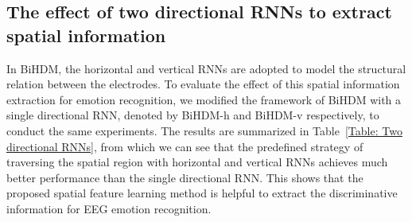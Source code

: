 \documentclass[journal]{IEEEtran}
\begin{document}
\subsection{The effect of two directional RNNs to extract spatial information}
In BiHDM, the horizontal and vertical RNNs are adopted to model the structural relation between the electrodes. To evaluate the effect of this spatial information extraction for emotion recognition, we modified the framework of BiHDM with a single directional RNN, denoted by BiHDM-h and BiHDM-v respectively, to conduct the same experiments. The results are summarized in Table~\ref{Table: Two directional RNNs}, from which we can see that the predefined strategy of traversing the spatial region with horizontal and vertical RNNs achieves much better performance than the single directional RNN. This shows that the proposed spatial feature learning method is helpful to extract the discriminative information for EEG emotion recognition.
\end{document}

